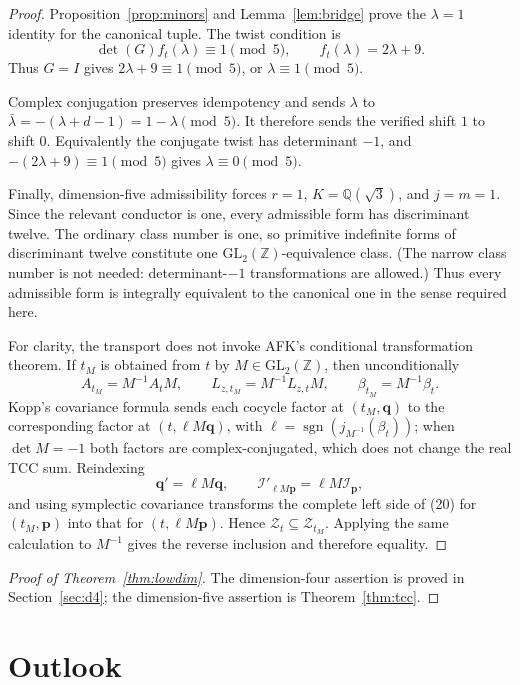 \documentclass[11pt]{article}
\newcommand{\Q}{\mathbb Q}
\newcommand{\Z}{\mathbb Z}
\begin{document}
\begin{proof}
Proposition~\ref{prop:minors} and Lemma~\ref{lem:bridge} prove the
$\lambda=1$ identity for the canonical tuple.  The twist condition is
\[
 \det(G)f_t(\lambda)\equiv1\pmod5,\qquad
 f_t(\lambda)=2\lambda+9.
\]
Thus $G=I$ gives $2\lambda+9\equiv1\pmod5$, or
$\lambda\equiv1\pmod5$.

Complex conjugation preserves idempotency and sends
$\lambda$ to
$\bar\lambda=-(\lambda+d-1)=1-\lambda\pmod5$.
It therefore sends the verified shift $1$ to shift $0$.
Equivalently the conjugate twist has determinant $-1$, and
$-(2\lambda+9)\equiv1\pmod5$ gives $\lambda\equiv0\pmod5$.

Finally, dimension-five admissibility forces $r=1$,
$K=\Q(\sqrt3)$, and $j=m=1$.  Since the relevant conductor is one,
every admissible form has discriminant twelve.  The ordinary class
number is one, so primitive indefinite forms of discriminant twelve
constitute one $\mathrm{GL}_2(\Z)$-equivalence class.  (The narrow class
number is not needed: determinant-$-1$ transformations are allowed.)
Thus every admissible form is integrally equivalent to the canonical
one in the sense required here.

For clarity, the transport does not invoke AFK's conditional
transformation theorem.  If $t_M$ is obtained from $t$ by
$M\in\mathrm{GL}_2(\Z)$, then unconditionally
\[
 A_{t_M}=M^{-1}A_tM,\qquad
 L_{z,t_M}=M^{-1}L_{z,t}M,\qquad
 \beta_{t_M}=M^{-1}\beta_t.
\]
Kopp's covariance formula sends each cocycle factor at
$(t_M,\boldsymbol q)$ to the corresponding factor at
$(t,\ell M\boldsymbol q)$, with
$\ell=\operatorname{sgn}(j_{M^{-1}}(\beta_t))$; when
$\det M=-1$ both factors are complex-conjugated, which does not change
the real TCC sum.  Reindexing
\[
 \boldsymbol q'=\ell M\boldsymbol q,\qquad
 \mathcal I'_{\ell M\boldsymbol p}=\ell M\mathcal I_{\boldsymbol p},
\]
and using symplectic covariance transforms the complete left side of
(20) for $(t_M,\boldsymbol p)$ into that for
$(t,\ell M\boldsymbol p)$.  Hence
$\mathcal Z_t\subseteq\mathcal Z_{t_M}$.  Applying the same calculation to
$M^{-1}$ gives the reverse inclusion and therefore equality.
\end{proof}

\begin{proof}[Proof of Theorem~\ref{thm:lowdim}]
The dimension-four assertion is proved in Section~\ref{sec:d4}; the
dimension-five assertion is
Theorem~\ref{thm:tcc}.
\end{proof}

\section{Outlook}
\end{document}

